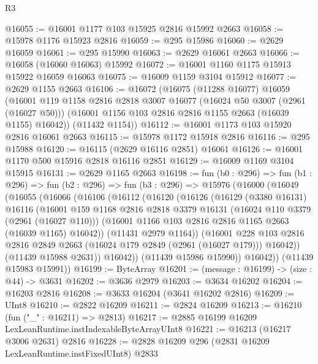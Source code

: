 \begin{lexlean}{R3}
\begin{coremodule}
@16055 := @16001 @1177 @103 @15925 @2816 @15992 @2663
@16058 := @15978 @1176 @15923 @2816
@16059 := @295 @15986
@16060 := @2629 @16059
@16061 := @295 @15990
@16063 := @2629 @16061 @2663
@16066 := @16058 (@16060 @16063) @15992
@16072 := @16001 @1160 @1175 @15913 @15922 @16059 @16063
@16075 := @16009 @1159 @3104 @15912
@16077 := @2629 @1155 @2663
@16106 := @16072
    (@16075
      (@11288 @16077)
      @16059
      (@16001
        @119
        @1158
        @2816
        @2818
        @3007
        @16077
        (@16024 @50 @3007 (@2961 (@16027 @50)))
        (@16001 @1156 @103 @2816 @2816 @1155 @2663 (@16039 @1155) @16042))
      (@11432 @1154))
@16112 := @16001 @1173 @103 @15920 @2816 @16061 @2663
@16115 := @15978 @1172 @15918 @2816
@16116 := @295 @15988
@16120 := @16115 (@2629 @16116 @2851) @16061
@16126 := @16001 @1170 @500 @15916 @2818 @16116 @2851
@16129 := @16009 @1169 @3104 @15915
@16131 := @2629 @1165 @2663
@16198 := fun (b0 : @296) =>
  fun (b1 : @296) =>
  fun (b2 : @296) =>
  fun (b3 : @296) =>
  @15976
    (@16000
      (@16049
        (@16055
          (@16066
            (@16106
              (@16112
                (@16120
                  (@16126
                    (@16129
                      (@3380 @16131)
                      @16116
                      (@16001
                        @159
                        @1168
                        @2816
                        @2818
                        @3379
                        @16131
                        (@16024 @110 @3379 (@2961 (@16027 @110)))
                        (@16001 @1166 @103 @2816 @2816 @1165 @2663 (@16039 @1165) @16042))
                      (@11431 @2979 @1164))
                    (@16001
                      @228
                      @103
                      @2816
                      @2816
                      @2849
                      @2663
                      (@16024 @179 @2849 (@2961 (@16027 @179)))
                      @16042))
                  (@11439 @15988 @2631))
                @16042))
            (@11439 @15986 @15990))
          @16042))
      (@11439 @15983 @15991))
@16199 := ByteArray
@16201 := (message : @16199) -> (size : @44) -> @3631
@16202 := @3636 @2979
@16203 := @3634 @16202
@16204 := @16203 @2816
@16208 := @3633 @16204 (@3641 @16202 @2816)
@16209 := UInt8
@16210 := @2822 @16209
@16211 := @2824 @16209
@16213 := @16210 (fun ("_" : @16211) => @2813)
@16217 := @2885 @16199 @16209 LexLeanRuntime.instIndexableByteArrayUInt8
@16221 := @16213 (@16217 @3006 @2631) @2816
@16228 := @2828 @16209 @296 (@2831 @16209 LexLeanRuntime.instFixedUInt8) @2833

\end{coremodule}
\end{lexlean}
